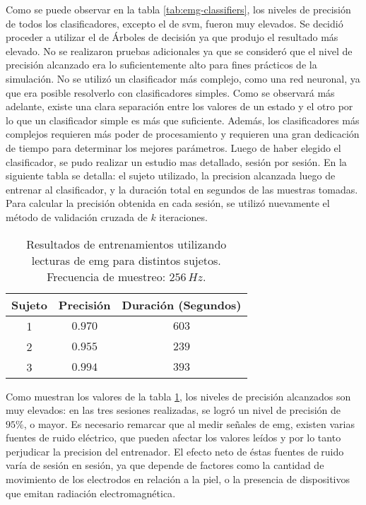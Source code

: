 Como se puede observar en la tabla \ref{tab:emg-classifiers}, los niveles de precisión de todos los clasificadores, excepto el de \acrshort{svm}, fueron muy elevados. Se decidió proceder a utilizar el de Árboles de decisión ya que produjo el resultado más elevado. No se realizaron pruebas adicionales ya que se consideró que el nivel de precisión alcanzado era lo suficientemente alto para fines prácticos de la simulación. No se utilizó un clasificador más complejo, como una red neuronal, ya que era posible resolverlo con clasificadores simples. Como se observará más adelante, existe una clara separación entre los valores de un estado y el otro por lo que un clasificador simple es más que suficiente. Además, los clasificadores más complejos requieren más poder de procesamiento y requieren una gran dedicación de tiempo para determinar los mejores parámetros. Luego de haber elegido el clasificador, se pudo realizar un estudio mas detallado, sesión por sesión. En la siguiente tabla se detalla: el sujeto utilizado, la precision alcanzada luego de entrenar al clasificador, y la duración total en segundos de las muestras tomadas. Para calcular la precisión obtenida en cada sesión, se utilizó nuevamente el método de validación cruzada de $k$ iteraciones.

\begin{table}[H]
\centering
\begin{tabular}{ |c|c|c| } 
 \hline
 Sujeto & Precisión & Duración (Segundos) \\ 
 \hline
 1 & $0.970$ & $603$ \\
  \hline
 2 & $0.955$ & $239$ \\
  \hline
 3 & $0.994$ & $393$ \\

 \hline
\end{tabular}
\caption{Resultados de entrenamientos utilizando lecturas de \acrshort{emg} para distintos sujetos. Frecuencia de muestreo: $256\,Hz$.}
\label{tab:emg-results}
\end{table}

Como muestran los valores de la tabla \ref{tab:emg-results}, los niveles de precisión alcanzados son muy elevados: en las tres sesiones realizadas, se logró un nivel de precisión de $95\%$, o mayor. Es necesario remarcar que al medir señales de \acrshort{emg}, existen varias fuentes de ruido eléctrico, que pueden afectar los valores leídos y por lo tanto perjudicar la precision del entrenador. El efecto neto de éstas fuentes de ruido varía de sesión en sesión, ya que depende de factores como la cantidad de movimiento de los electrodos en relación a la piel, o la presencia de dispositivos que emitan radiación electromagnética\cite{emg-delsys}.

